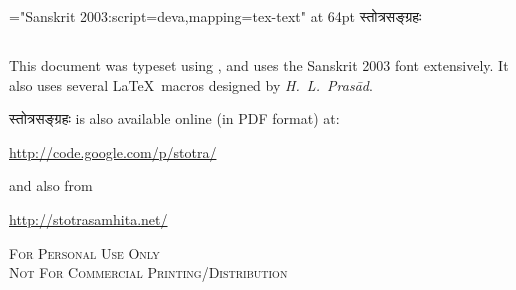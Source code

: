 \thispagestyle{empty}
\begin{titlepage}
\vspace*{6.5cm}\centerline{\font\x="Sanskrit 2003:script=deva,mapping=tex-text" at 64pt \x स्तोत्रसङ्ग्रहः}
\end{titlepage}
\vspace*{5cm}
\begin{center}
\parbox{10cm}{\subsection*{}
\noindent {} This document was typeset using \XeLaTeX, and uses the Sanskrit 2003 font extensively. It also uses several \LaTeX\ macros designed by \textit{H.~L.~Prasād}.

\begin{center}
{ स्तोत्रसङ्ग्रहः} is also available online (in PDF format) at: 

\url{http://code.google.com/p/stotra/}

and also from

\url{http://stotrasamhita.net/}


\vspace*{1cm}

{\scshape{For Personal Use Only\\
 Not For Commercial Printing/Distribution}}
\end{center}
}
\end{center}
\clearemptydoublepage
\setcounter{page}{0}
\renewcommand{\chaptermark}[1]{%
\markboth{#1}{}}
\begin{center}
\begin{large}
\tableofcontents
\end{large}
\end{center}

\mbox{}
\clearpage
\thispagestyle{empty}
\clearemptydoublepage

\clearemptydoublepage

\clearemptydoublepage

\newpage
\clearemptydoublepage
